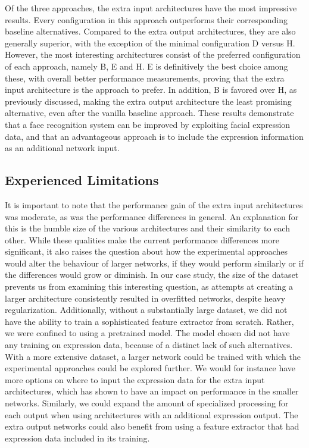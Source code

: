 \noindent Of the three approaches, the extra input architectures have the most impressive results. Every configuration in this approach outperforms their corresponding baseline alternatives. Compared to the extra output architectures, they are also generally superior, with the exception of the minimal configuration D versus H. However, the most interesting architectures consist of the preferred configuration of each approach, namely B, E and H. E is definitively the best choice among these, with overall better performance measurements, proving that the extra input architecture is the approach to prefer. In addition, B is favored over H, as previously discussed, making the extra output architecture the least promising alternative, even after the vanilla baseline approach. These results demonstrate that a face recognition system can be improved by exploiting facial expression data, and that an advantageous approach is to include the expression information as an additional network input.

\subsection{Experienced Limitations}

It is important to note that the performance gain of the extra input architectures was moderate, as was the performance differences in general. An explanation for this is the humble size of the various architectures and their similarity to each other. While these qualities make the current performance differences more significant, it also raises the question about how the experimental approaches would alter the behaviour of larger networks, if they would perform similarly or if the differences would grow or diminish. In our case study, the size of the dataset prevents us from examining this interesting question, as attempts at creating a larger architecture consistently resulted in overfitted networks, despite heavy regularization. Additionally, without a substantially large dataset, we did not have the ability to train a sophisticated feature extractor from scratch. Rather, we were confined to using a pretrained model. The model chosen did not have any training on expression data, because of a distinct lack of such alternatives. \\

\noindent With a more extensive dataset, a larger network could be trained with which the experimental approaches could be explored further. We would for instance have more options on where to input the expression data for the extra input architectures, which has shown to have an impact on performance in the smaller networks. Similarly, we could expand the amount of specialized processing for each output when using architectures with an additional expression output. The extra output networks could also benefit from using a feature extractor that had expression data included in its training.


\cleardoublepage